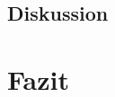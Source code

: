 \documentclass[12pt,a4paper]{article}
\begin{document}
\subsection*{Diskussion}





\section{Fazit}
\end{document}
